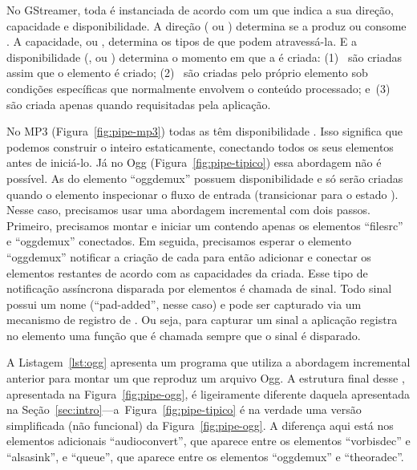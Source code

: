 \documentclass{SBCbookchapter}
\begin{document}
No GStreamer, toda  é instanciada de acordo com um  que
indica a sua direção, capacidade e disponibilidade.  A direção (
ou ) determina se a  produz ou consome .
A capacidade, ou , determina os tipos de  que podem
atravessá-la.  E a disponibilidade (,  ou
) determina o momento em que a  é criada: (1)~ são criadas assim que o elemento é criado; (2)~
são criadas pelo próprio elemento sob condições específicas que normalmente
envolvem o conteúdo processado; e~(3)~ são criada apenas
quando requisitadas pela aplicação.

No  MP3 (Figura~\ref{fig:pipe-mp3}) todas as  têm
disponibilidade .  Isso significa que podemos construir o
 inteiro estaticamente, conectando todos os seus elementos
antes de iniciá-lo.  Já no  Ogg (Figura~\ref{fig:pipe-tipico})
essa abordagem não é possível.  As  do elemento ``oggdemux''
possuem disponibilidade  e só serão criadas quando o elemento
inspecionar o fluxo de entrada (transicionar para o estado ).
Nesse caso, precisamos usar uma abordagem incremental com dois passos.
Primeiro, precisamos montar e iniciar um  contendo apenas os
elementos ``filesrc'' e ``oggdemux'' conectados.  Em seguida, precisamos
esperar o elemento ``oggdemux'' notificar a criação de cada 
para então adicionar e conectar os elementos restantes de acordo com as
capacidades da  criada.  Esse tipo de notificação assíncrona
disparada por elementos é chamada de sinal.  Todo sinal possui um nome
(``pad-added'', nesse caso) e pode ser capturado via um mecanismo de
registro de .  Ou seja, para capturar um sinal a aplicação
registra no elemento uma função  que é chamada sempre que o
sinal é disparado.

A Listagem~\ref{lst:ogg} apresenta um programa que utiliza a abordagem
incremental anterior para montar um  que reproduz um arquivo
Ogg.  A estrutura final desse , apresentada na
Figura~\ref{fig:pipe-ogg}, é ligeiramente diferente daquela apresentada na
Seção~\ref{sec:intro}---a~Figura~\ref{fig:pipe-tipico} é na verdade uma
versão simplificada (não funcional) da Figura~\ref{fig:pipe-ogg}.
A diferença aqui está nos elementos adicionais ``audioconvert'', que aparece
entre os elementos ``vorbisdec'' e ``alsasink'', e ``queue'', que aparece
entre os elementos ``oggdemux'' e ``theoradec''.
\end{document}
